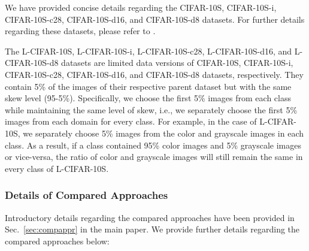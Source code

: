 \documentclass[10pt,twocolumn,letterpaper]{article}
\begin{document}
We have provided concise details regarding the CIFAR-10S, CIFAR-10S-i, CIFAR-10S-c28, CIFAR-10S-d16, and CIFAR-10S-d8 datasets. For further details regarding these datasets, please refer to \cite{wang2020towards}.


The L-CIFAR-10S, L-CIFAR-10S-i, L-CIFAR-10S-c28, L-CIFAR-10S-d16, and L-CIFAR-10S-d8 datasets are limited data versions of CIFAR-10S, CIFAR-10S-i, CIFAR-10S-c28, CIFAR-10S-d16, and CIFAR-10S-d8 datasets, respectively. They contain 5\% of the images of their respective parent dataset but with the same skew level (95-5\%). Specifically, we choose the first 5\% images from each class while maintaining the same level of skew, i.e., we separately choose the first 5\% images from each domain for every class. For example, in the case of L-CIFAR-10S, we separately choose 5\% images from the color and grayscale images in each class. As a result, if a class contained 95\% color images and 5\% grayscale images or vice-versa, the ratio of color and grayscale images will still remain the same in every class of L-CIFAR-10S.


\subsubsection{Details of Compared Approaches}
Introductory details regarding the compared approaches have been provided in Sec.~\ref{sec:compappr} in the main paper. We provide further details regarding the compared approaches below:
\end{document}
